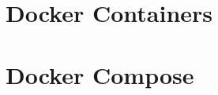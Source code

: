 \documentclass[10pt, compress, aspectratio=169, xcolor={table,usenames,dvipsnames}]{beamer}
\begin{document}
\section{Docker Containers}
\label{sec:orgcf59fa9}
\section{Docker Compose}
\label{sec:orgc94f0b3}
\end{document}

